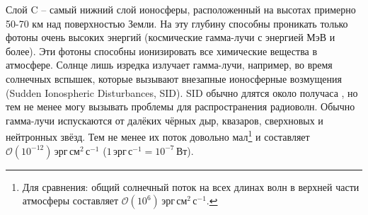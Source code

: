 Слой C -- самый нижний слой ионосферы, расположенный на высотах примерно 50-70 км над поверхностью Земли.
На эту глубину способны проникать только фотоны очень высоких энергий (космические гамма-лучи с энергией МэВ и более).
Эти фотоны способны ионизировать все химические вещества в атмосфере.
Солнце лишь изредка излучает гамма-лучи, например, во время солнечных вспышек, которые вызывают внезапные ионосферные возмущения (Sudden Ionospheric Disturbances, SID).
SID обычно длятся около получаса \cite{Rishbeth2003}, но тем не менее могу вызывать проблемы для распространения радиоволн.    
Обычно гамма-лучи испускаются от далёких чёрных дыр, квазаров, сверхновых и нейтронных звёзд.
Тем не менее их поток довольно мал\footnote{Для сравнения: общий солнечный поток на всех длинах волн в верхней части атмосферы составляет $\mathcal{O}(10^{6})\,\text{эрг}\,\text{см}^2\,\text{с}^{-1}$.} и составляет $\mathcal{O}(10^{-12})\,\text{эрг}\,\text{см}^2\,\text{с}^{-1}$ ($1\,\text{эрг}\,\text{с}^{-1}=10^{-7}\,\text{Вт}$).

